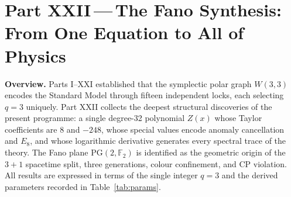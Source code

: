 
\part*{Part XXII\,---\,The Fano Synthesis: From One Equation to All of Physics}

\bigskip

\noindent\textbf{Overview.}\;
Parts I--XXI established that the symplectic polar graph $W(3,3)$
encodes the Standard Model through fifteen independent locks, each
selecting $q=3$ uniquely.  Part XXII collects the deepest structural
discoveries of the present programme: a single degree-32 polynomial
$Z(x)$ whose Taylor coefficients are $8$ and $-248$, whose special
values encode anomaly cancellation and $E_8$, and whose logarithmic
derivative generates every spectral trace of the theory.  The Fano plane
$\mathrm{PG}(2,\mathbb{F}_2)$ is identified as the geometric origin of
the $3+1$ spacetime split, three generations, colour confinement, and
CP violation.  All results are expressed in terms of the single integer
$q=3$ and the derived parameters recorded in Table~\ref{tab:params}.

